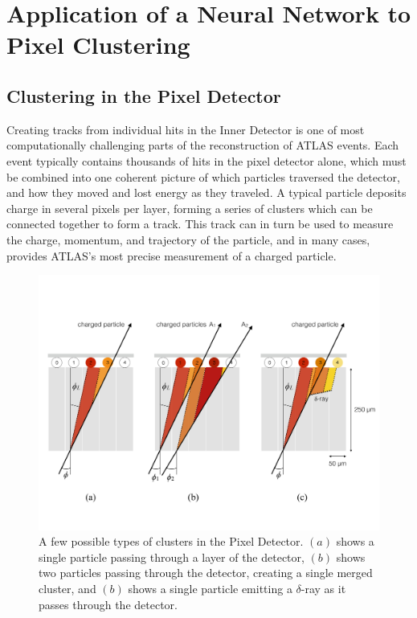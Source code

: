 
\chapter{Application of a Neural Network to Pixel Clustering} %

\label{sec:NN} %



\section{Clustering in the Pixel Detector}

Creating tracks from individual hits in the Inner Detector is one of most computationally challenging parts of the reconstruction of ATLAS events. Each event typically contains thousands of hits in the pixel detector alone, which must be combined into one coherent picture of which particles traversed the detector, and how they moved and lost energy as they traveled. A typical particle deposits charge in several pixels per layer, forming a series of clusters which can be connected together to form a track. This track can in turn be used to measure the charge, momentum, and trajectory of the particle, and in many cases, provides ATLAS's most precise measurement of a charged particle. 


\begin{centering}
\begin{figure}[bth]
\myfloatalign
\includegraphics[width=.90\linewidth]{figures/nn/cluster_types.pdf}
\caption{A few possible types of clusters in the Pixel Detector. $(a)$ shows a single particle passing through a layer of the detector, $(b)$ shows two particles passing through the detector, creating a single merged cluster, and $(b)$ shows a single particle emitting a $\delta$-ray as it passes through the detector.}
\label{fig:cluster_types}
\end{figure}
\end{centering}

